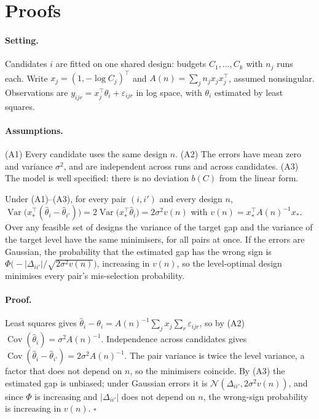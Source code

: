 \FloatBarrier
\section{Proofs}
\label{app:design}

\paragraph{Setting.} Candidates $i$ are fitted on one shared design: budgets
$C_1,\dots,C_k$ with $n_j$ runs each. Write $x_j=(1,-\log C_j)^\top$ and  %
$A(n)=\sum_j n_j x_j x_j^\top$, assumed nonsingular. Observations are
$y_{ijr}=x_j^\top\theta_i+\varepsilon_{ijr}$ in log space, with $\theta_i$
estimated by least squares.

\paragraph{Assumptions.} (A1) Every candidate uses the same design $n$.
(A2) The errors have mean zero and variance $\sigma^2$, and are independent  %
across runs and across candidates. (A3) The model is well specified: there is
no deviation $b(C)$ from the linear form.

\begin{theorem}
Under (A1)--(A3), for every pair $(i,i')$ and every design $n$,
$\operatorname{Var}\bigl(x_*^\top(\hat\theta_i-\hat\theta_{i'})\bigr)
 = 2\operatorname{Var}\bigl(x_*^\top\hat\theta_i\bigr) = 2\sigma^2 v(n)$ with  %
$v(n)=x_*^\top A(n)^{-1}x_*$. Over any feasible set of designs the variance of  %
the target gap and the variance of the target level have the same minimisers,
for all pairs at once. If the errors are Gaussian, the probability that the
estimated gap has the wrong sign is
$\Phi\bigl(-|\Delta_{ii'}|/\sqrt{2\sigma^2 v(n)}\bigr)$, increasing in $v(n)$,  %
so the level-optimal design minimises every pair's mis-selection probability.
\end{theorem}

\paragraph{Proof.} Least squares gives
$\hat\theta_i-\theta_i=A(n)^{-1}\sum_j x_j\sum_r\varepsilon_{ijr}$, so by (A2)  %
$\operatorname{Cov}(\hat\theta_i)=\sigma^2A(n)^{-1}$. Independence across  %
candidates gives $\operatorname{Cov}(\hat\theta_i-\hat\theta_{i'})=2\sigma^2A(n)^{-1}$.  %
The pair variance is twice the level variance, a factor that does not depend on
$n$, so the minimisers coincide. By (A3) the estimated gap is unbiased; under
Gaussian errors it is $\mathcal N(\Delta_{ii'},2\sigma^2v(n))$, and since $\Phi$  %
is increasing and $|\Delta_{ii'}|$ does not depend on $n$, the wrong-sign
probability is increasing in $v(n)$. \hfill$\square$

